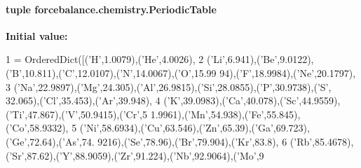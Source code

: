 \hypertarget{namespaceforcebalance_1_1chemistry_a16a882da023657ddee2421d09da00ca7}{
\paragraph[{Periodic\-Table}]{\setlength{\rightskip}{0pt plus 5cm}tuple forcebalance.\-chemistry.\-Periodic\-Table}}\label{namespaceforcebalance_1_1chemistry_a16a882da023657ddee2421d09da00ca7}
{\bfseries Initial value\-:}
\begin{DoxyCode}
1 = OrderedDict([(\textcolor{stringliteral}{'H'},1.0079),(\textcolor{stringliteral}{'He'},4.0026),
2                              (\textcolor{stringliteral}{'Li'},6.941),(\textcolor{stringliteral}{'Be'},9.0122),(\textcolor{stringliteral}{'B'},10.811),(\textcolor{stringliteral}{'C'},12.0107),(\textcolor{stringliteral}{'N'},14.0067),(\textcolor{stringliteral}{'O'},15.99
      94),(\textcolor{stringliteral}{'F'},18.9984),(\textcolor{stringliteral}{'Ne'},20.1797),
3                              (\textcolor{stringliteral}{'Na'},22.9897),(\textcolor{stringliteral}{'Mg'},24.305),(\textcolor{stringliteral}{'Al'},26.9815),(\textcolor{stringliteral}{'Si'},28.0855),(\textcolor{stringliteral}{'P'},30.9738),(\textcolor{stringliteral}{'S'},
      32.065),(\textcolor{stringliteral}{'Cl'},35.453),(\textcolor{stringliteral}{'Ar'},39.948),
4                              (\textcolor{stringliteral}{'K'},39.0983),(\textcolor{stringliteral}{'Ca'},40.078),(\textcolor{stringliteral}{'Sc'},44.9559),(\textcolor{stringliteral}{'Ti'},47.867),(\textcolor{stringliteral}{'V'},50.9415),(\textcolor{stringliteral}{'Cr'},5
      1.9961),(\textcolor{stringliteral}{'Mn'},54.938),(\textcolor{stringliteral}{'Fe'},55.845),(\textcolor{stringliteral}{'Co'},58.9332),
5                              (\textcolor{stringliteral}{'Ni'},58.6934),(\textcolor{stringliteral}{'Cu'},63.546),(\textcolor{stringliteral}{'Zn'},65.39),(\textcolor{stringliteral}{'Ga'},69.723),(\textcolor{stringliteral}{'Ge'},72.64),(\textcolor{stringliteral}{'As'},74.
      9216),(\textcolor{stringliteral}{'Se'},78.96),(\textcolor{stringliteral}{'Br'},79.904),(\textcolor{stringliteral}{'Kr'},83.8),
6                              (\textcolor{stringliteral}{'Rb'},85.4678),(\textcolor{stringliteral}{'Sr'},87.62),(\textcolor{stringliteral}{'Y'},88.9059),(\textcolor{stringliteral}{'Zr'},91.224),(\textcolor{stringliteral}{'Nb'},92.9064),(\textcolor{stringliteral}{'Mo'},9

\end{DoxyCode}
